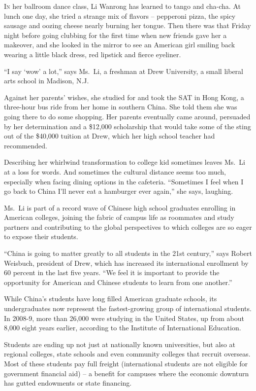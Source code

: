 ﻿\documentclass[12pt]{article}
\begin{document}
\lettrine{I}{n} her ballroom dance class, Li Wanrong has learned to tango
and cha-cha. At lunch one day, she tried a strange mix of flavors -- pepperoni pizza, the spicy
sausage and oozing cheese nearly burning her tongue. Then there was that Friday night before going
clubbing for the first time when new friends gave her a makeover, and she looked in the mirror to
see an American girl smiling back wearing a little black dress, red lipstick and fierce eyeliner.

``I say `wow' a lot,'' says Ms.~Li, a freshman at Drew University, a small liberal arts school in
Madison, N.J.

Against her parents' wishes, she studied for and took the SAT in Hong Kong, a three-hour bus ride
from her home in southern China. She told them she was going there to do some shopping. Her parents
eventually came around, persuaded by her determination and a \$12,000 scholarship that would take
some of the sting out of the \$40,000 tuition at Drew, which her high school teacher had
recommended.

Describing her whirlwind transformation to college kid sometimes leaves Ms.~Li at a loss for words.
And sometimes the cultural distance seems too much, especially when facing dining options in the
cafeteria. ``Sometimes I feel when I go back to China I'll never eat a hamburger ever again,'' she
says, laughing.

Ms.~Li is part of a record wave of Chinese high school graduates enrolling in American colleges,
joining the fabric of campus life as roommates and study partners and contributing to the global
perspectives to which colleges are so eager to expose their students.

``China is going to matter greatly to all students in the 21st century,'' says Robert Weisbuch,
president of Drew, which has increased its international enrollment by 60 percent in the last five
years. ``We feel it is important to provide the opportunity for American and Chinese students to
learn from one another.''

While China's students have long filled American graduate schools, its undergraduates now represent
the fastest-growing group of international students. In 2008-9, more than 26,000 were studying in
the United States, up from about 8,000 eight years earlier, according to the Institute of
International Education.

Students are ending up not just at nationally known universities, but also at regional colleges,
state schools and even community colleges that recruit overseas. Most of these students pay full
freight (international students are not eligible for government financial aid) -- a benefit for
campuses where the economic downturn has gutted endowments or state financing.
\end{document}

